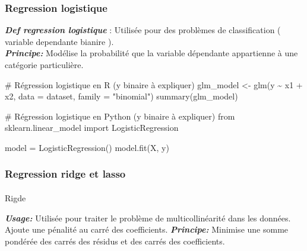 \documentclass[
  letterpaper,
  DIV=11,
  numbers=noendperiod]{scrartcl}
\makeatletter
\let\oldparagraph\paragraph
\renewcommand{\paragraph}{
    \@ifstar
      \xxxParagraphStar
      \xxxParagraphNoStar
  }
\newcommand{\xxxParagraphStar}[1]{\oldparagraph*{#1}\mbox{}}
\newcommand{\xxxParagraphNoStar}[1]{\oldparagraph{#1}\mbox{}}
\newenvironment{Shaded}{\begin{snugshade}}{\end{snugshade}}
\newcommand{\AttributeTok}[1]{\textcolor[rgb]{0.40,0.45,0.13}{#1}}
\newcommand{\CommentTok}[1]{\textcolor[rgb]{0.37,0.37,0.37}{#1}}
\newcommand{\FunctionTok}[1]{\textcolor[rgb]{0.28,0.35,0.67}{#1}}
\newcommand{\NormalTok}[1]{\textcolor[rgb]{0.00,0.23,0.31}{#1}}
\newcommand{\OtherTok}[1]{\textcolor[rgb]{0.00,0.23,0.31}{#1}}
\newcommand{\SpecialCharTok}[1]{\textcolor[rgb]{0.37,0.37,0.37}{#1}}
\newcommand{\StringTok}[1]{\textcolor[rgb]{0.13,0.47,0.30}{#1}}
\makeatother
\begin{document}
\subsubsection{Regression logistique}\label{regression-logistique}

\textbf{\emph{Def regression logistique}} : Utilisée pour des problèmes
de classification ( variable dependante bianire ).\\

\textbf{\emph{Principe:}} Modélise la probabilité que la variable
dépendante appartienne à une catégorie particulière.\\

\begin{Shaded}
\begin{Highlighting}[]
\CommentTok{\# Régression logistique en R (y binaire à expliquer)}
\NormalTok{glm\_model }\OtherTok{\textless{}{-}} \FunctionTok{glm}\NormalTok{(y }\SpecialCharTok{\textasciitilde{}}\NormalTok{ x1 }\SpecialCharTok{+}\NormalTok{ x2, }\AttributeTok{data =}\NormalTok{ dataset, }\AttributeTok{family =} \StringTok{"binomial"}\NormalTok{)}
\FunctionTok{summary}\NormalTok{(glm\_model)}
\end{Highlighting}
\end{Shaded}

\begin{Shaded}
\begin{Highlighting}[]
\CommentTok{\# Régression logistique en Python (y binaire à expliquer)}
\NormalTok{from sklearn.linear\_model import LogisticRegression}

\NormalTok{model }\OtherTok{=} \FunctionTok{LogisticRegression}\NormalTok{()}
\FunctionTok{model.fit}\NormalTok{(X, y)}
\end{Highlighting}
\end{Shaded}

\subsubsection{Regression ridge et
lasso}\label{regression-ridge-et-lasso}

\paragraph{Rigde}\label{rigde}

\textbf{\emph{Usage:}} Utilisée pour traiter le problème de
multicollinéarité dans les données. Ajoute une pénalité au carré des
coefficients. \textbf{\emph{Principe:}} Minimise une somme pondérée des
carrés des résidus et des carrés des coefficients.
\end{document}
